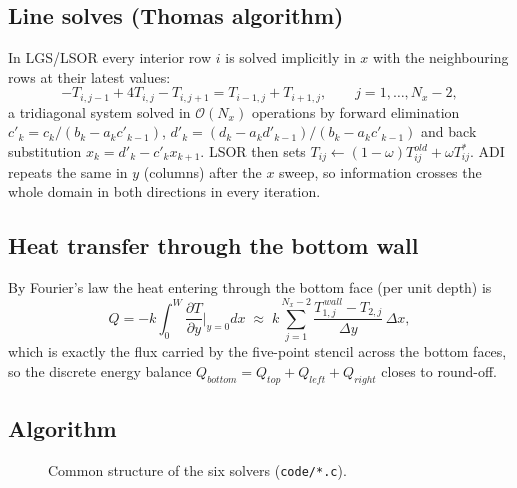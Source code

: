 \subsection{Line solves (Thomas algorithm)}
In LGS/LSOR every interior row $i$ is solved implicitly in $x$ with the neighbouring rows at their latest values:
\begin{equation}
-T_{i,j-1}+4T_{i,j}-T_{i,j+1}=T_{i-1,j}+T_{i+1,j},\qquad j=1,\dots,N_x-2, \end{equation}
a tridiagonal system solved in $\mathcal{O}(N_x)$ operations by forward elimination
$c'_k=c_k/(b_k-a_kc'_{k-1})$, $d'_k=(d_k-a_kd'_{k-1})/(b_k-a_kc'_{k-1})$ and back substitution $x_k=d'_k-c'_kx_{k+1}$. LSOR then sets $T_{ij}\leftarrow(1-\omega)T_{ij}^{old}+\omega T^{*}_{ij}$. ADI repeats the same in $y$ (columns) after the $x$ sweep, so information crosses the whole domain in both directions in every iteration.

\subsection{Heat transfer through the bottom wall}
By Fourier's law the heat entering through the bottom face (per unit depth) is
\begin{equation}
Q=-k\!\int_0^W\!\frac{\partial T}{\partial y}\Big|_{y=0}\!dx\;\approx\;k\sum_{j=1}^{N_x-2}\frac{T_{1,j}^{\,wall}-T_{2,j}}{\Delta y}\,\Delta x ,
\end{equation}
which is exactly the flux carried by the five-point stencil across the bottom faces, so the discrete energy balance $Q_{bottom}=Q_{top}+Q_{left}+Q_{right}$ closes to round-off.

\subsection{Algorithm}
\begin{figure}[H]\centering
{}\caption{Common structure of the six solvers (\texttt{code/*.c}).}\end{figure}

